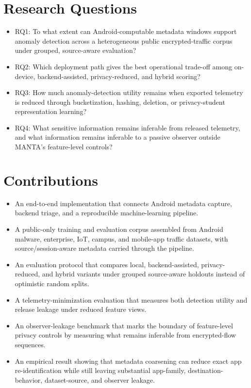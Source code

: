 \section{Research Questions}
\begin{itemize}[leftmargin=*]
  \item RQ1: To what extent can Android-computable metadata windows support anomaly detection
  across a heterogeneous public encrypted-traffic corpus under grouped, source-aware evaluation?
  \item RQ2: Which deployment path gives the best operational trade-off among on-device,
  backend-assisted, privacy-reduced, and hybrid scoring?
  \item RQ3: How much anomaly-detection utility remains when exported telemetry is reduced through
  bucketization, hashing, deletion, or privacy-student representation learning?
  \item RQ4: What sensitive information remains inferable from released telemetry, and what
  information remains inferable to a passive observer outside MANTA's feature-level controls?
\end{itemize}

\section{Contributions}
\begin{itemize}[leftmargin=*]
  \item An end-to-end implementation that connects Android metadata capture, backend triage, and a
  reproducible machine-learning pipeline.
  \item A public-only training and evaluation corpus assembled from Android malware, enterprise,
  IoT, campus, and mobile-app traffic datasets, with source/session-aware metadata carried through
  the pipeline.
  \item An evaluation protocol that compares local, backend-assisted, privacy-reduced, and hybrid
  variants under grouped source-aware holdouts instead of optimistic random splits.
  \item A telemetry-minimization evaluation that measures both detection utility and release
  leakage under reduced feature views.
  \item An observer-leakage benchmark that marks the boundary of feature-level privacy controls by
  measuring what remains inferable from encrypted-flow sequences.
  \item An empirical result showing that metadata coarsening can reduce exact app re-identification while
  still leaving substantial app-family, destination-behavior, dataset-source, and observer leakage.
\end{itemize}

